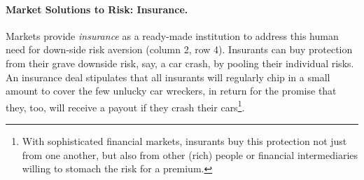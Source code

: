 	

\paragraph{Market Solutions to Risk: Insurance.}  \label{sec:insurance} Markets provide \emph{insurance} as a ready-made institution to address this human need for down-side risk aversion (column 2, row 4). Insurants can buy protection from their grave downside risk, say, a car crash, by pooling their individual risks. An insurance deal stipulates that all insurants will regularly chip in a small amount to cover the few unlucky car wreckers, in return for the promise that they, too, will receive a payout if they crash their cars\footnote{
	With sophisticated financial markets, insurants buy this protection not just from one another, but also from other (rich) people or financial intermediaries willing to stomach the risk for a premium.}. 

